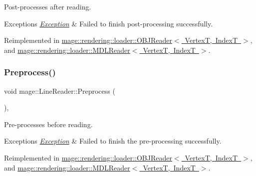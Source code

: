 Post-\/processes after reading.


\begin{DoxyExceptions}{Exceptions}
{\em \mbox{\hyperlink{classmage_1_1_exception}{Exception}}} & Failed to finish post-\/processing successfully. \\
\hline
\end{DoxyExceptions}


Reimplemented in \mbox{\hyperlink{classmage_1_1rendering_1_1loader_1_1_o_b_j_reader_a281c16ef7d20a7c1416923f3cadee33a}{mage\+::rendering\+::loader\+::\+O\+B\+J\+Reader$<$ Vertex\+T, Index\+T $>$}}, and \mbox{\hyperlink{classmage_1_1rendering_1_1loader_1_1_m_d_l_reader_abbff75b1926904c6c0bcb0aeae8f3fdc}{mage\+::rendering\+::loader\+::\+M\+D\+L\+Reader$<$ Vertex\+T, Index\+T $>$}}.

\mbox{\label{classmage_1_1_line_reader_ad81a84bf9ecd81b9a391698afbd5eb61}} 
\subsubsection{\texorpdfstring{Preprocess()}{Preprocess()}}
{\footnotesize\ttfamily void mage\+::\+Line\+Reader\+::\+Preprocess (\begin{DoxyParamCaption}{ }\end{DoxyParamCaption})\hspace{0.3cm}{\ttfamily [private]}, {\ttfamily [virtual]}}

Pre-\/processes before reading.


\begin{DoxyExceptions}{Exceptions}
{\em \mbox{\hyperlink{classmage_1_1_exception}{Exception}}} & Failed to finish the pre-\/processing successfully. \\
\hline
\end{DoxyExceptions}


Reimplemented in \mbox{\hyperlink{classmage_1_1rendering_1_1loader_1_1_o_b_j_reader_ad082a6295259f7e8af2c60c182ea55d3}{mage\+::rendering\+::loader\+::\+O\+B\+J\+Reader$<$ Vertex\+T, Index\+T $>$}}, and \mbox{\hyperlink{classmage_1_1rendering_1_1loader_1_1_m_d_l_reader_a397f0c0eedc56c983fc3a7074aa4e577}{mage\+::rendering\+::loader\+::\+M\+D\+L\+Reader$<$ Vertex\+T, Index\+T $>$}}.

\mbox{\label{classmage_1_1_line_reader_ad351b7c68e5784d0dca690a5b8fe7528}} 

